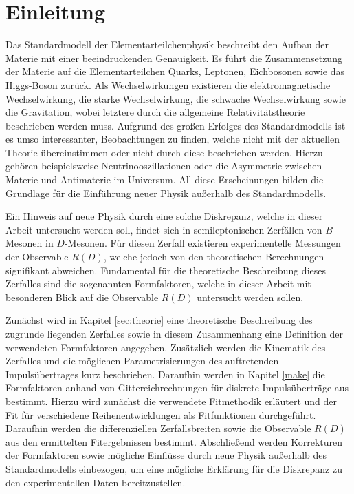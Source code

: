 \chapter{Einleitung}

Das Standardmodell der Elementarteilchenphysik beschreibt den Aufbau der Materie mit einer beeindruckenden Genauigkeit.
Es führt die Zusammensetzung der Materie auf die Elementarteilchen Quarks, Leptonen, Eichbosonen sowie das Higgs-Boson zurück.
Als Wechselwirkungen existieren die elektromagnetische Wechselwirkung, die starke Wechselwirkung, die schwache Wechselwirkung sowie die Gravitation, wobei letztere durch die allgemeine Relativitätstheorie beschrieben werden muss.
Aufgrund des großen Erfolges des Standardmodells ist es umso interessanter, Beobachtungen zu finden, welche nicht mit der aktuellen Theorie übereinstimmen oder nicht durch diese beschrieben werden.
Hierzu gehören beispielsweise Neutrinooszillationen oder die Asymmetrie zwischen Materie und Antimaterie im Universum.
All diese Erscheinungen bilden die Grundlage für die Einführung neuer Physik außerhalb des Standardmodells.

Ein Hinweis auf neue Physik durch eine solche Diskrepanz, welche in dieser Arbeit untersucht werden soll, findet sich in semileptonischen Zerfällen von $B$-Mesonen in $D$-Mesonen.
Für diesen Zerfall existieren experimentelle Messungen der Observable $R(D)$, welche jedoch von den theoretischen Berechnungen signifikant abweichen.
Fundamental für die theoretische Beschreibung dieses Zerfalles sind die sogenannten Formfaktoren, welche in dieser Arbeit mit besonderen Blick auf die Observable $R(D)$ untersucht werden sollen.

Zunächst wird in Kapitel \ref{sec:theorie} eine theoretische Beschreibung des zugrunde liegenden Zerfalles sowie in diesem Zusammenhang eine Definition der verwendeten Formfaktoren angegeben.
Zusätzlich werden die Kinematik des Zerfalles und die möglichen Parametrisierungen des auftretenden Impulsübertrages kurz beschrieben.
Daraufhin werden in Kapitel \ref{make} die Formfaktoren anhand von Gittereichrechnungen für diskrete Impulsüberträge aus \cite{PhysRevD.92.034506} bestimmt.
Hierzu wird zunächst die verwendete Fitmethodik erläutert und der Fit für verschiedene Reihenentwicklungen als Fitfunktionen durchgeführt.
Daraufhin werden die differenziellen Zerfallsbreiten sowie die Observable $R(D)$ aus den ermittelten Fitergebnissen bestimmt.
Abschließend werden Korrekturen der Formfaktoren sowie mögliche Einflüsse durch neue Physik außerhalb des Standardmodells einbezogen, um eine mögliche Erklärung für die Diskrepanz zu den experimentellen Daten bereitzustellen.
